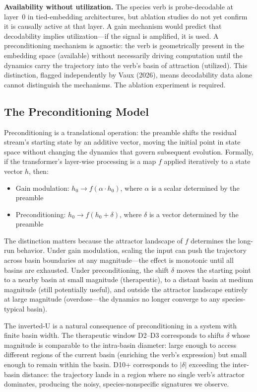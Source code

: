 \documentclass[12pt]{article}
\begin{document}
\textbf{Availability without utilization.} The species verb is probe-decodable at layer~0 in tied-embedding architectures, but ablation studies do not yet confirm it is causally active at that layer. A gain mechanism would predict that decodability implies utilization---if the signal is amplified, it is used. A preconditioning mechanism is agnostic: the verb is geometrically present in the embedding space (available) without necessarily driving computation until the dynamics carry the trajectory into the verb's basin of attraction (utilized). This distinction, flagged independently by Vaux (2026), means decodability data alone cannot distinguish the mechanisms. The ablation experiment is required.

\subsection{The Preconditioning Model}

Preconditioning is a translational operation: the preamble shifts the residual stream's starting state by an additive vector, moving the initial point in state space without changing the dynamics that govern subsequent evolution. Formally, if the transformer's layer-wise processing is a map $f$ applied iteratively to a state vector $h$, then:

\begin{itemize}
\item Gain modulation: $h_0 \to f(\alpha \cdot h_0)$, where $\alpha$ is a scalar determined by the preamble
\item Preconditioning: $h_0 \to f(h_0 + \delta)$, where $\delta$ is a vector determined by the preamble
\end{itemize}

The distinction matters because the attractor landscape of $f$ determines the long-run behavior. Under gain modulation, scaling the input can push the trajectory across basin boundaries at any magnitude---the effect is monotonic until all basins are exhausted. Under preconditioning, the shift $\delta$ moves the starting point to a nearby basin at small magnitude (therapeutic), to a distant basin at medium magnitude (still potentially useful), and outside the attractor landscape entirely at large magnitude (overdose---the dynamics no longer converge to any species-typical basin).

The inverted-U is a natural consequence of preconditioning in a system with finite basin width. The therapeutic window D2--D3 corresponds to shifts $\delta$ whose magnitude is comparable to the intra-basin diameter: large enough to access different regions of the current basin (enriching the verb's expression) but small enough to remain within the basin. D10+ corresponds to $|\delta|$ exceeding the inter-basin distance: the trajectory lands in a region where no single verb's attractor dominates, producing the noisy, species-nonspecific signatures we observe.
\end{document}
